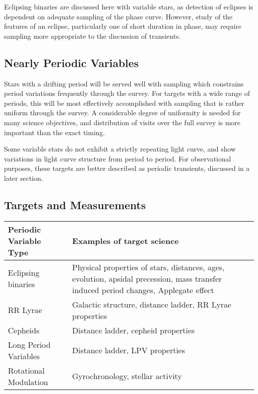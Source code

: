 Eclipsing binaries are discussed here with variable stars, as detection of eclipses is dependent on adequate sampling of the phase curve.  However, study of the  features of an eclipse, particularly one of short duration in phase, may require sampling more appropriate to the discussion of transients.

\subsection{Nearly Periodic Variables}

Stars with a drifting  period will be served well with sampling which constrains period variations frequently through the survey.  For targets with a wide range of periods, this will be most effectively accomplished with sampling that is rather uniform through the survey.  A considerable degree of uniformity is needed for many science objectives, and distribution of visits over the full survey is more important than the exact timing.

Some variable stars do not exhibit a strictly repeating light curve, and show variations in light curve structure from period to period.  For observational purposes, these targets are better described as periodic transients, discussed in a later section.



\subsection{Targets and Measurements}
\label{sec:keyword:targets}

\begin{center} 
\begin{tabular}{| l | p{10cm} |}
\hline Periodic Variable Type & Examples of target science\\
\hline
Eclipsing binaries & Physical properties of stars, distances, ages, evolution, apsidal precession, mass transfer induced period changes, Applegate effect\\ 
RR Lyrae & Galactic structure, distance ladder, RR Lyrae properties\\
Cepheids & Distance ladder, cepheid properties\\
Long Period Variables & Distance ladder, LPV properties\\
Rotational Modulation & Gyrochronology, stellar activity\\
 \hline \end{tabular} 
 \end{center}	

